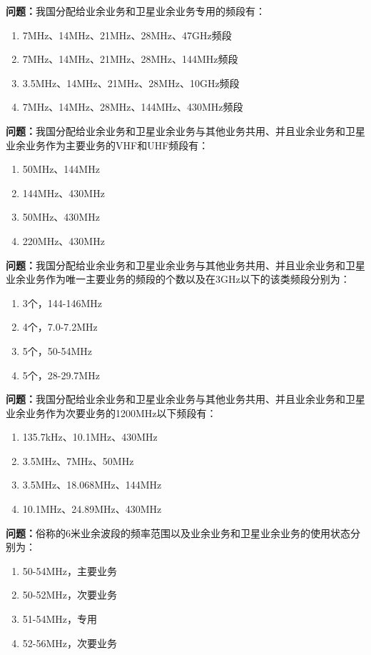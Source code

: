\documentclass{ctexbook}
\begin{document}
\textbf{问题：}我国分配给业余业务和卫星业余业务专用的频段有：
\begin{enumerate}[label=\Alph*), leftmargin=3em]
\item 7MHz、14MHz、21MHz、28MHz、47GHz频段
\item 7MHz、14MHz、21MHz、28MHz、144MHz频段
\item 3.5MHz、14MHz、21MHz、28MHz、10GHz频段
\item 7MHz、14MHz、28MHz、144MHz、430MHz频段
\end{enumerate}

\textbf{问题：}我国分配给业余业务和卫星业余业务与其他业务共用、并且业余业务和卫星业余业务作为主要业务的VHF和UHF频段有：
\begin{enumerate}[label=\Alph*), leftmargin=3em]
\item 50MHz、144MHz
\item 144MHz、430MHz
\item 50MHz、430MHz
\item 220MHz、430MHz
\end{enumerate}

\textbf{问题：}我国分配给业余业务和卫星业余业务与其他业务共用、并且业余业务和卫星业余业务作为唯一主要业务的频段的个数以及在3GHz以下的该类频段分别为：
\begin{enumerate}[label=\Alph*), leftmargin=3em]
\item 3个，144-146MHz
\item 4个，7.0-7.2MHz
\item 5个，50-54MHz
\item 5个，28-29.7MHz
\end{enumerate}

\textbf{问题：}我国分配给业余业务和卫星业余业务与其他业务共用、并且业余业务和卫星业余业务作为次要业务的1200MHz以下频段有：
\begin{enumerate}[label=\Alph*), leftmargin=3em]
\item 135.7kHz、10.1MHz、430MHz
\item 3.5MHz、7MHz、50MHz
\item 3.5MHz、18.068MHz、144MHz
\item 10.1MHz、24.89MHz、430MHz
\end{enumerate}

\textbf{问题：}俗称的6米业余波段的频率范围以及业余业务和卫星业余业务的使用状态分别为：
\begin{enumerate}[label=\Alph*), leftmargin=3em]
\item 50-54MHz，主要业务
\item 50-52MHz，次要业务
\item 51-54MHz，专用
\item 52-56MHz，次要业务
\end{enumerate}
\end{document}
